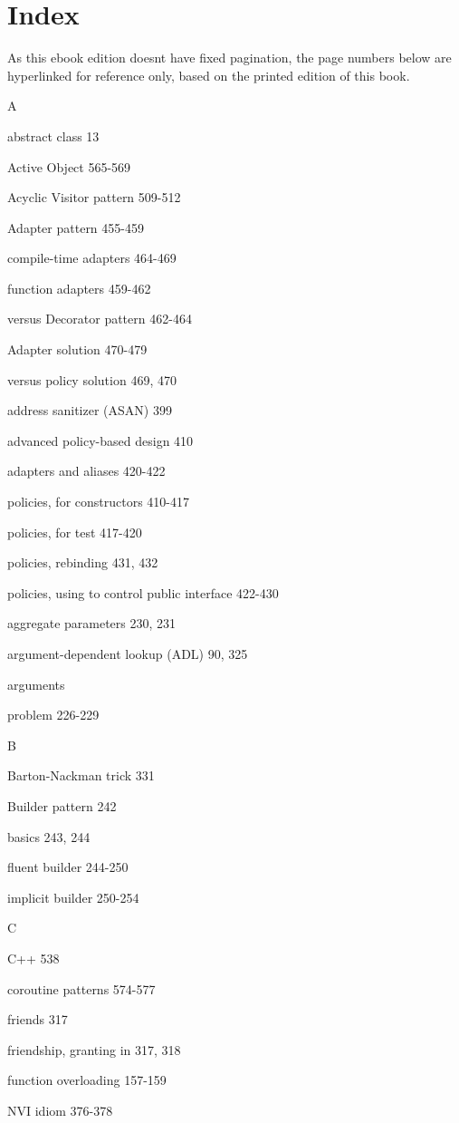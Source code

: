 \section{Index}

As this ebook edition doesn\textquotesingle t have fixed pagination, the page numbers below are hyperlinked for reference only, based on the printed edition of this book.

A

abstract class 13

Active Object 565-569

Acyclic Visitor pattern 509-512

Adapter pattern 455-459

compile-time adapters 464-469

function adapters 459-462

versus Decorator pattern 462-464

Adapter solution 470-479

versus policy solution 469, 470

address sanitizer (ASAN) 399

advanced policy-based design 410

adapters and aliases 420-422

policies, for constructors 410-417

policies, for test 417-420

policies, rebinding 431, 432

policies, using to control public interface 422-430

aggregate parameters 230, 231

argument-dependent lookup (ADL) 90, 325

arguments

problem 226-229

B

Barton-Nackman trick 331

Builder pattern 242

basics 243, 244

fluent builder 244-250

implicit builder 250-254

C

C++ 538

coroutine patterns 574-577

friends 317

friendship, granting in 317, 318

function overloading 157-159

NVI idiom 376-378

